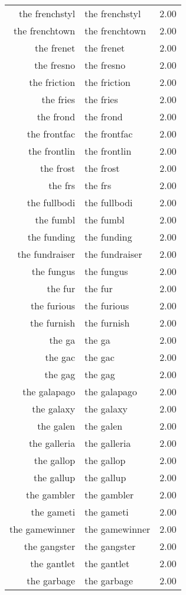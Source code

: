 \begin{table}[ht]
\begin{tabular}{rlr}
  the frenchstyl & the frenchstyl & 2.00 \\ 
  the frenchtown & the frenchtown & 2.00 \\ 
  the frenet & the frenet & 2.00 \\ 
  the fresno & the fresno & 2.00 \\ 
  the friction & the friction & 2.00 \\ 
  the fries & the fries & 2.00 \\ 
  the frond & the frond & 2.00 \\ 
  the frontfac & the frontfac & 2.00 \\ 
  the frontlin & the frontlin & 2.00 \\ 
  the frost & the frost & 2.00 \\ 
  the frs & the frs & 2.00 \\ 
  the fullbodi & the fullbodi & 2.00 \\ 
  the fumbl & the fumbl & 2.00 \\ 
  the funding & the funding & 2.00 \\ 
  the fundraiser & the fundraiser & 2.00 \\ 
  the fungus & the fungus & 2.00 \\ 
  the fur & the fur & 2.00 \\ 
  the furious & the furious & 2.00 \\ 
  the furnish & the furnish & 2.00 \\ 
  the ga & the ga & 2.00 \\ 
  the gac & the gac & 2.00 \\ 
  the gag & the gag & 2.00 \\ 
  the galapago & the galapago & 2.00 \\ 
  the galaxy & the galaxy & 2.00 \\ 
  the galen & the galen & 2.00 \\ 
  the galleria & the galleria & 2.00 \\ 
  the gallop & the gallop & 2.00 \\ 
  the gallup & the gallup & 2.00 \\ 
  the gambler & the gambler & 2.00 \\ 
  the gameti & the gameti & 2.00 \\ 
  the gamewinner & the gamewinner & 2.00 \\ 
  the gangster & the gangster & 2.00 \\ 
  the gantlet & the gantlet & 2.00 \\ 
  the garbage & the garbage & 2.00 \\ 

\end{tabular}
\end{table}
